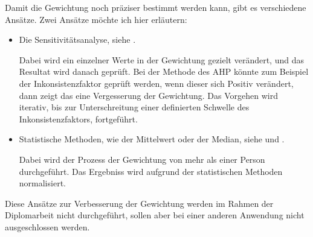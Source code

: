   Damit die Gewichtung noch präziser bestimmt werden kann, gibt es verschiedene
  Ansätze. Zwei Ansätze möchte ich hier erläutern:
  
  \begin{itemize}
    \item Die Sensitivitätsanalyse, siehe \cite{Sensitivitaetsanalyse}.
    
    Dabei wird ein einzelner Werte in der Gewichtung gezielt verändert, und das
    Resultat wird danach geprüft. Bei der Methode des \ac{AHP} könnte zum
    Beispiel der Inkonsistenzfaktor geprüft werden, wenn dieser sich Positiv
    verändert, dann zeigt das eine Vergesserung der Gewichtung. Das Vorgehen
    wird iterativ, bis zur Unterschreitung einer definierten Schwelle des
    Inkonsistenzfaktors, fortgeführt.
    
    \item Statistische Methoden, wie der Mittelwert oder der Median, siehe
    \cite{Median} und \cite{Mittelwert}.
    
    Dabei wird der Prozess der Gewichtung von mehr als einer Person
    durchgeführt. Das Ergebniss wird aufgrund der statistischen Methoden
    normalisiert.
  \end{itemize}
  
  \noindent
  Diese Ansätze zur Verbesserung der Gewichtung werden im Rahmen der
  Diplomarbeit nicht durchgeführt, sollen aber bei einer anderen Anwendung
  nicht ausgeschlossen werden.
